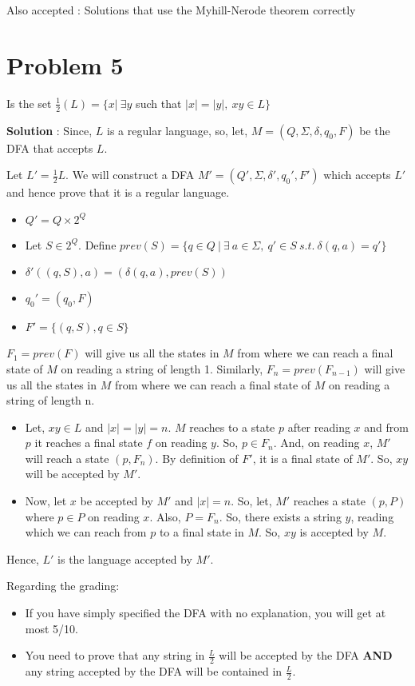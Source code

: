 \documentclass{article}
\begin{document}
    Also accepted : Solutions that use the Myhill-Nerode theorem correctly
    

    \section*{Problem 5} Is the set $\frac{1}{2}(L) = \{ x|~ \exists y$ such that $|x| = |y|, ~xy \in L \}$
    
    \textbf{Solution} : Since, $L$ is a regular language, so, let, $M = (Q,\Sigma, \delta, q_0, F)$ be the DFA that accepts $L$.
    
    Let $L' = \frac{1}{2}L $. We will construct a DFA $M' = (Q',\Sigma, \delta', q_0', F')$ which accepts $L'$ and hence prove that it is a regular language.
    \begin{itemize}
        \item $Q' = Q \times 2^Q $
        \item Let $S\in2^Q$. Define 
         $prev(S)= \{q \in Q\ | \ \exists\ a \in \Sigma,\ q' \in S\ s.t.\ \delta(q,a) = q'\}$
        \item $\delta'((q,S), a) = (\delta(q,a),prev(S))$
        \item $q_0' = (q_0,F)$
        \item $F' = \{(q,S), q\in S\}$
    \end{itemize}
    
    $F_1 = prev(F)$ will give us all the states in $M$ from where we can reach a final state of $M$ on reading a string of length 1. Similarly, $F_n = prev(F_{n-1})$ will give us all the states in $M$ from where we can reach a final state of $M$ on reading a string of length n.
    
    \begin{itemize}
        \item Let, $xy \in L$ and $|x| = |y| = n$. $M$ reaches to a state $p$ after reading $x$ and from $p$ it reaches a final state $f$ on reading $y$. So, $p \in F_n$. And, on reading $x$, $M'$ will reach a state $(p, F_n)$. By definition of $F'$, it is a final state of $M'$. So, $xy$ will be accepted by $M'$.
        \item Now, let $x$ be accepted by $M'$ and $|x| = n$. So, let, $M'$ reaches a state $(p, P)$ where $p \in P$ on reading $x$. Also, $P = F_n$. So, there exists a string $y$, reading which we can reach from $p$ to a final state in $M$. So, $xy$ is accepted by $M$.
    \end{itemize}
    Hence, $L'$ is the language accepted by $M'$.
    

    Regarding the grading:
    \begin{itemize}
        \item If you have simply specified the DFA with no explanation, you will get at most 5/10.
        \item You need to prove that any string in $\frac{L}{2}$ will be accepted by the DFA \textbf{AND} any string accepted by the DFA will be contained in $\frac{L}{2}$. 
    \end{itemize}
    
\end{document}
